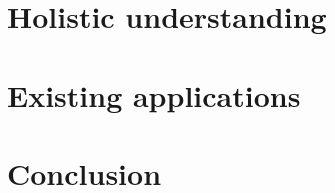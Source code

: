 \section{Holistic understanding} %
\label{sec:sota:holistic_understanding}


\section{Existing applications}
\label{sec:sota:applications}


\section{Conclusion}
\label{sec:sota:conclusion}


